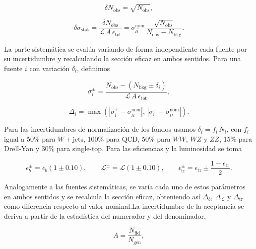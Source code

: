 \documentclass[9pt,a4paper,twocolumn,twoside]{rho-class/rho}
\begin{document}
\begin{equation}
    \delta N_{\mathrm{obs}} = \sqrt{N_{\mathrm{obs}}},
\end{equation}

\begin{equation}
    \delta \sigma_{\mathrm{stat}} = \frac{\delta N_{\mathrm{obs}}}{\mathcal{L}\,A\,\epsilon_{\mathrm{tot}}}
    = \sigma_{t\bar{t}}^{\mathrm{nom}}\,\frac{\sqrt{N_{\mathrm{obs}}}}{N_{\mathrm{obs}} - N_{\mathrm{bkg}}}.
\end{equation}

La parte sistemática se evalúa variando de forma independiente cada fuente por su incertidumbre y recalculando la sección eficaz en ambos sentidos. Para una fuente $i$ con variación $\delta_i$, definimos

\begin{equation}
    \sigma_i^{\pm} = \frac{N_{\mathrm{obs}} - \left(N_{\mathrm{bkg}} \pm \delta_i\right)}{\mathcal{L}\,A\,\epsilon_{\mathrm{tot}}},
\end{equation}

\begin{equation}
    \Delta_i = \max\left(\left|\sigma_i^{+} - \sigma_{t\bar{t}}^{\mathrm{nom}}\right|,\,\left|\sigma_i^{-} - \sigma_{t\bar{t}}^{\mathrm{nom}}\right|\right).
\end{equation}

Para las incertidumbres de normalización de los fondos usamos $\delta_i = f_i\,N_i$, con $f_i$ igual a 50\% para $W+$jets, 100\% para QCD, 50\% para $WW$, $WZ$ y $ZZ$, 15\% para Drell-Yan y 30\% para single-top. Para las eficiencias y la luminosidad se toma

\begin{equation}
    \epsilon_b^{\pm} = \epsilon_b\left(1 \pm 0.10\right), \qquad
    \mathcal{L}^{\pm} = \mathcal{L}\left(1 \pm 0.10\right), \qquad
    \epsilon_{\mathrm{tr}}^{\pm} = \epsilon_{\mathrm{tr}} \pm \frac{1-\epsilon_{\mathrm{tr}}}{2}.
\end{equation}

Analogamente a las fuentes sistemáticas, se varía cada uno de estos parámetros en ambos sentidos y se recalcula la sección eficaz, obteniendo así $\Delta_b$, $\Delta_{\mathcal{L}}$ y $\Delta_{\mathrm{tr}}$ como diferencia respecto al valor nominal.La incertidumbre de la aceptancia se deriva a partir de la estadística del numerador y del denominador,

\begin{equation}
    A = \frac{N_{\mathrm{fid}}}{N_{\mathrm{gen}}},
\end{equation}
\end{document}
